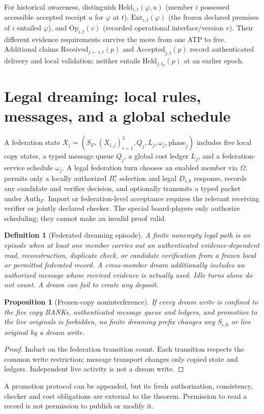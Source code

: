 \documentclass[11pt]{article}
\newtheorem{proposition}[theorem]{Proposition}
\newtheorem{definition}[theorem]{Definition}
\newcommand{\Auth}{\mathrm{Auth}}
\begin{document}
For historical awareness, distinguish $\mathrm{Held}_{i,t}(\varphi,u)$ (member $i$ possessed accessible accepted receipt $u$ for $\varphi$ at $t$), $\mathrm{Ent}_{i,t}(\varphi)$ (the frozen declared premises of $i$ entailed $\varphi$), and $\mathrm{Op}_{i,t}(v)$ (recorded operational interface/version $v$). Their different evidence requirements survive the move from one ATP to five. Additional claims $\mathrm{Received}_{j\leftarrow i,t}(p)$ and $\mathrm{Accepted}_{j,t}(p)$ record authenticated delivery and local validation; neither entails $\mathrm{Held}_{j,t_0}(p)$ at an earlier epoch.

\section{Legal dreaming: local rules, messages, and a global schedule}
A federation state $X_j=(S_F,(X_{i,j})_{i=1}^5,Q_j,L_j,\omega_j,\mathrm{phase}_j)$ includes five local copy states, a typed message queue $Q_j$, a global cost ledger $L_j$, and a federation-service schedule $\omega_j$. A legal federation turn chooses an enabled member via $\Omega$, permits only a locally authorized $B_i^\star$ selection and legal $D_{i,k}$ response, records any candidate and verifier decision, and optionally transmits a typed packet under $\Auth_F$. Import or federation-level acceptance requires the relevant receiving verifier or jointly declared checker. The special board-players only authorize scheduling; they cannot make an invalid proof valid.
\begin{definition}[Federated dreaming episode]
A finite nonempty legal path is an episode when at least one member carries out an authenticated evidence-dependent read, reconstruction, duplicate check, or candidate verification from a frozen local or permitted federated record. A \emph{cross-member dream} additionally includes an authorized message whose received evidence is actually used. Idle turns alone do not count. A dream can fail to create any deposit.
\end{definition}
\begin{proposition}[Frozen-copy noninterference]
If every dream write is confined to the five copy BANKs, authenticated message queue and ledgers, and promotion to the live originals is forbidden, no finite dreaming prefix changes any $S_{i,0}$ or live original \emph{by a dream write}.
\end{proposition}
\begin{proof}Induct on the federation transition count. Each transition respects the common write restriction; message transport changes only copied state and ledgers. Independent live activity is not a dream write.\end{proof}
A promotion protocol can be appended, but its fresh authorization, consistency, checker and cost obligations are external to the theorem. Permission to read a record is not permission to publish or modify it.
\end{document}
